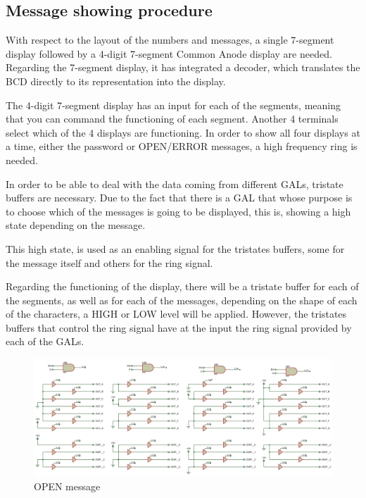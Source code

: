 \subsection{Message showing procedure}

With respect to the layout of the numbers and messages, a single 7-segment display followed by a 4-digit 7-segment Common Anode display are needed. 
Regarding the 7-segment display, it has integrated a decoder, which translates the BCD directly to its representation into the display.

\medskip

The 4-digit 7-segment display has an input for each of the segments, meaning that you can command the functioning of each segment. Another 4 terminals select which of the 4 displays are functioning. In order to show all four displays at a time, either the password or OPEN/ERROR messages, a high frequency ring is needed.

\medskip

In order to be able to deal with the data coming from different GALs, tristate buffers are necessary. Due to the fact that there is a GAL that whose purpose is to choose which of the messages is going to be displayed, this is, showing a high state depending on the message. 

\medskip

This high state, is used as an enabling signal for the tristates buffers, some for the message itself and others for the ring signal. 


Regarding the functioning of the display, there will be a tristate buffer for each of the segments, as well as for each of the messages, depending on the shape of each of the characters, a HIGH or LOW level will be applied. However, the tristates buffers that control the ring signal have at the input the ring signal provided by each of the GALs.

\begin{figure}[H]
    \centering
    \includegraphics[scale = 0.35]{Graphics/MESSAGE/OPEN.PDF}
    \caption{OPEN message}
    \label{fig:OPEN_MESSAGE}
\end{figure}



